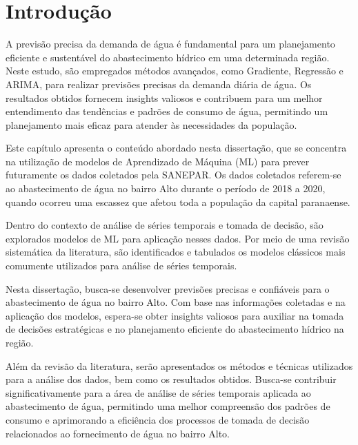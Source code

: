 

\section{Introdu{\c c}{\~a}o} \label{sec:int}

A previsão precisa da demanda de água é fundamental para um planejamento eficiente e sustentável do abastecimento hídrico em uma determinada região. Neste estudo, são empregados métodos avançados, como Gradiente, Regressão e ARIMA, para realizar previsões precisas da demanda diária de água. Os resultados obtidos fornecem insights valiosos e contribuem para um melhor entendimento das tendências e padrões de consumo de água, permitindo um planejamento mais eficaz para atender às necessidades da população.

Este capítulo apresenta o conteúdo abordado nesta dissertação, que se concentra na utilização de modelos de Aprendizado de Máquina (ML) para prever futuramente os dados coletados pela SANEPAR. Os dados coletados referem-se ao abastecimento de água no bairro Alto durante o período de 2018 a 2020, quando ocorreu uma escassez que afetou toda a população da capital paranaense.

Dentro do contexto de análise de séries temporais e tomada de decisão, são explorados modelos de ML para aplicação nesses dados. Por meio de uma revisão sistemática da literatura, são identificados e tabulados os modelos clássicos mais comumente utilizados para análise de séries temporais.

Nesta dissertação, busca-se desenvolver previsões precisas e confiáveis para o abastecimento de água no bairro Alto. Com base nas informações coletadas e na aplicação dos modelos, espera-se obter insights valiosos para auxiliar na tomada de decisões estratégicas e no planejamento eficiente do abastecimento hídrico na região.

Além da revisão da literatura, serão apresentados os métodos e técnicas utilizados para a análise dos dados, bem como os resultados obtidos. Busca-se contribuir significativamente para a área de análise de séries temporais aplicada ao abastecimento de água, permitindo uma melhor compreensão dos padrões de consumo e aprimorando a eficiência dos processos de tomada de decisão relacionados ao fornecimento de água no bairro Alto.


          

   

    

    

    